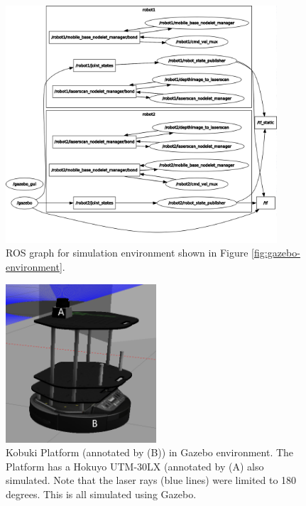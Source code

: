 \begin{figure}[H]
    \centering
    \includegraphics[width=0.9\textwidth]{figs/rosgraph.png}
    \caption{ROS graph for simulation environment shown in Figure \ref{fig:gazebo-environment}.}
    \label{fig:rosgraph-gazebo}
\end{figure}


\begin{figure}[H]
    \centering
    \includegraphics[width=0.5\textwidth]{figs/Kuboki_Platform_Gazebo.png}
    \caption{Kobuki Platform (annotated by (B)) in Gazebo environment. The Platform has a Hokuyo UTM-30LX (annotated by (A) also simulated. Note that the laser rays (blue lines) were limited to 180 degrees. This is all simulated using Gazebo.}
    \label{fig:kuboki-platform-gazebo}
\end{figure}

